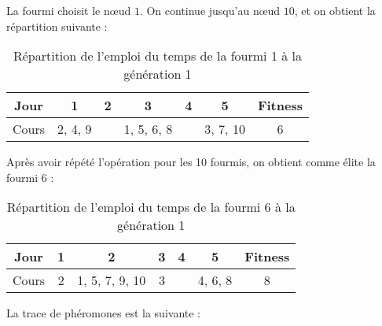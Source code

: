 La fourmi choisit le n\oe ud $1$.
On continue jusqu'au n\oe ud $10$, et on obtient la répartition suivante :

\begin{table}[H]
    \centering
    \begin{tabular}{|c|c|c|c|c|c|c|}
        \hline
        Jour  & 1       & 2 & 3          & 4 & 5        & Fitness \\
        \hline
        Cours & 2, 4, 9 &   & 1, 5, 6, 8 &   & 3, 7, 10 & 6       \\
        \hline
    \end{tabular}
    \caption{Répartition de l'emploi du temps de la fourmi 1 à la génération 1}\label{tab:fourmi-1-gen-1}
\end{table}

Après avoir répété l'opération pour les 10 fourmis, on obtient comme élite la fourmi 6 :

\begin{table}[!h]
    \centering
    \begin{tabular}{|c|c|c|c|c|c|c|}
        \hline
        Jour  & 1 & 2              & 3 & 4 & 5       & Fitness \\
        \hline
        Cours & 2 & 1, 5, 7, 9, 10 & 3 &   & 4, 6, 8 & 8       \\
        \hline
    \end{tabular}
    \caption{Répartition de l'emploi du temps de la fourmi 6 à la génération 1}\label{tab:fourmi-6-gen-1}
\end{table}

La trace de phéromones est la suivante :

